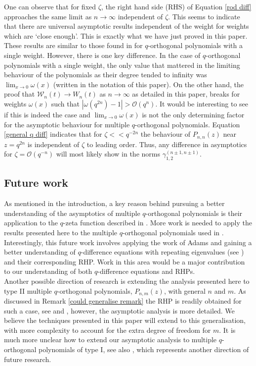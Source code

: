 \documentclass[a4paper,reqno]{amsart}
\numberwithin{equation}{section}
\numberwithin{figure}{section}
\begin{document}
One can observe that for fixed $\zeta$, the right hand side (RHS) of Equation \eqref{rod diff} approaches the same limit as $n\to\infty$ independent of $\zeta$. This seems to indicate that there are universal asymptotic results independent of the weight for weights which are `close enough'. This is exactly what we have just proved in this paper. These results are similar to those found in \cite{NJTLconst} for $q$-orthogonal polynomials with a single weight. However, there is one key difference. In the case of $q$-orthogonal polynomials with a single weight, the only value that mattered in the limiting behaviour of the polynomials as their degree tended to infinity was $\lim_{x\to0}\omega(x)$ (written in the notation of this paper). On the other hand, the proof that $\mathcal{W}_n(t)\to W_n(t)$ as $n\to\infty$ as detailed in this paper, breaks for weights $\omega(x)$ such that $|\omega(q^{2n})-1| > \mathcal{O}(q^n)$. It would be interesting to see if this is indeed the case and $\lim_{x\to0}\omega(x)$ is not the only determining factor for the asymptotic behaviour for multiple $q$-orthogonal polynomials. Equation \eqref{general q diff} indicates that for $\zeta << q^{-2n}$ the behaviour of $P_{n,n}(z)$ near $z=q^{2n}$ is independent of $\zeta$ to leading order. Thus, any difference in asymptotics for $\zeta =  \mathcal{O}(q^{-n}) $ will most likely show in the norms $\gamma^{(n\pm1,n\pm1)}_{1,2}$.

\subsection{Future work}
As mentioned in the introduction, a key reason behind pursuing a better understanding of the asymptotics of multiple $q$-orthogonal polynomials is their application to the $q$-zeta function described in \cite{POSTELMANS2007119}. More work is needed to apply the results presented here to the multiple $q$-orthogonal polynomials used in \cite{POSTELMANS2007119}. Interestingly, this future work involves applying the work of Adams \cite{Adams} and gaining a better understanding of $q$-difference equations with repeating eigenvalues (see \cite{Adams}) and their corresponding RHP. Work in this area would be a major contribution to our understanding of both $q$-difference equations and RHPs.\\

Another possible direction of research is extending the analysis presented here to type II multiple $q$-orthogonal polynomials, $P_{n,m}(z)$, with general $n$ and $m$. As discussed in Remark \ref{could generalise remark} the RHP is readily obtained for such a case, see \cite[Section 5]{BK} and \cite[Chapter 23.6]{ismail2005classical}, however, the asymptotic analysis is more detailed. We believe the techniques presented in this paper will extend to this generalisation, with more complexity to account for the extra degree of freedom for $m$. It is much more unclear how to extend our asymptotic analysis to multiple $q$-orthogonal polynomials of type I, see also \cite[Section 5]{BK}, which represents another direction of future research.
\end{document}
